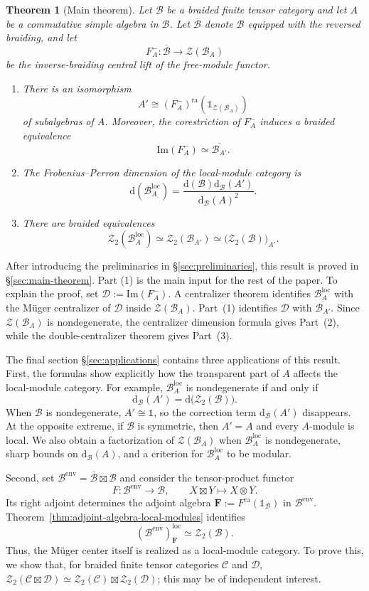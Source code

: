 \documentclass[11pt,reqno]{amsart}
\numberwithin{equation}{section}
\theoremstyle{plain}
\newtheorem{theorem}[thmctr]{Theorem}
\theoremstyle{definition}
\theoremstyle{remark}
\newcommand{\unit}{\mathds{1}}
\newcommand{\B}{\mathcal{B}}
\newcommand{\C}{\mathcal{C}}
\newcommand{\D}{\mathcal{D}}
\newcommand{\Z}{\mathcal{Z}}
\newcommand{\loc}{\mathrm{loc}}
\newcommand{\ra}{\mathrm{ra}}
\newcommand{\im}{\mathrm{Im}}
\newcommand{\FP}{\mathrm{d}}
\newcommand{\oB}{\overline{\B}}
\newcommand{\bF}{\mathbf{F}}
\begin{document}
\begin{theorem}[Main theorem]\label{thm:main}
Let $\B$ be a braided finite tensor category and let $A$ be a commutative
simple algebra in $\B$. Let $\oB$ denote $\B$ equipped with the reversed
braiding, and let
\[
  F_A^-:\oB\longrightarrow\Z(\B_A)
\]
be the inverse-braiding central lift of the free-module functor. 
\begin{enumerate}
  \item There is an isomorphism
  \[
    A' \cong (F_A^-)^{\ra}(\unit_{\Z(\B_A)})
  \]
  of subalgebras of $A$. Moreover, the corestriction of $F_A^-$ induces a
  braided equivalence
  \[
    \im(F_A^-) \simeq \overline{\B_{A'}}.
  \]
  \item The Frobenius--Perron dimension of the local-module category is
  \[
    \FP(\B_A^{\loc})
    =
    \frac{\FP(\B)\FP_{\B}(A')}{\FP_{\B}(A)^2}.
  \]
  \item There are braided equivalences
  \[
    \Z_2(\B_A^{\loc})
    \simeq
    \Z_2(\B_{A'})
    \simeq
    \bigl(\Z_2(\B)\bigr)_{A'}.
  \]
\end{enumerate}
\end{theorem}

After introducing the preliminaries in \S\ref{sec:preliminaries}, this result is proved in \S\ref{sec:main-theorem}.  
Part (1) is the main input for the rest of the paper. To explain the proof, set
$\D:=\im(F_A^-)$. A centralizer theorem identifies $\B_A^{\loc}$ with the
M\"uger centralizer of $\D$ inside $\Z(\B_A)$. Part~(1) identifies
$\D$ with $\overline{\B_{A'}}$. Since $\Z(\B_A)$ is nondegenerate, the
centralizer dimension formula gives Part~(2), while the double-centralizer
theorem gives Part~(3).

The final section \S\ref{sec:applications} contains three applications of this result. First,
the formulas show explicitly how the transparent part of $A$ affects the
local-module category. For example, $\B_A^{\loc}$ is nondegenerate if and
only if
\[
  \FP_{\B}(A')=\FP\bigl(\Z_2(\B)\bigr).
\]
When $\B$ is nondegenerate, $A'\cong\unit$, so the correction term
$\FP_{\B}(A')$ disappears. At the opposite extreme, if $\B$ is symmetric,
then $A'=A$ and every $A$-module is local. We also obtain a factorization of
$\Z(\B_A)$ when $\B_A^{\loc}$ is nondegenerate, sharp bounds on
$\FP_{\B}(A)$, and a criterion for $\B_A^{\loc}$ to be modular. 

Second, set $\mathcal{B}^{\mathrm{env}} =\oB\boxtimes\B$ and consider the tensor-product
functor
\[
  F:\B^{\mathrm{env}}\longrightarrow\B,
  \qquad
  X\boxtimes Y\longmapsto X\otimes Y.
\]
Its right adjoint determines the adjoint algebra $\bF:=F^\ra(\unit_\B)$ in
$\B^{\mathrm{env}}$. Theorem~\ref{thm:adjoint-algebra-local-modules}
identifies
\[
  (\B^{\mathrm{env}})_\bF^{\loc}
  \simeq
  \Z_2(\B).
\]
Thus, the M\"uger center itself is realized as a local-module category. To prove this, we show that, for braided finite tensor
categories $\C$ and $\D$, $\Z_2(\C\boxtimes\D) \simeq \Z_2(\C)\boxtimes\Z_2(\D)$; this may be of independent interest.
\end{document}
